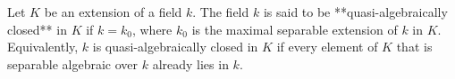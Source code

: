 Let $K$ be an extension of a field $k$. The field $k$ is said to be **quasi-algebraically closed** in $K$ if $k = k_0$, where $k_0$ is the maximal separable extension of $k$ in $K$. Equivalently, $k$ is quasi-algebraically closed in $K$ if every element of $K$ that is separable algebraic over $k$ already lies in $k$.
